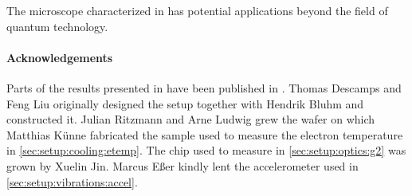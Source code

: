 The microscope characterized in \thispart has potential applications beyond the field of quantum technology.

\paragraph{Acknowledgements}
Parts of the results presented in \thispart have been published in .
Thomas Descamps and Feng Liu originally designed the setup together with Hendrik Bluhm and constructed it.
Julian Ritzmann and Arne Ludwig grew the wafer on which Matthias Künne fabricated the sample used to measure the electron temperature in \cref{sec:setup:cooling:etemp}.
The chip used to measure  in \cref{sec:setup:optics:g2} was grown by Xuelin Jin.
Marcus Eßer kindly lent the accelerometer used in \cref{sec:setup:vibrations:accel}.